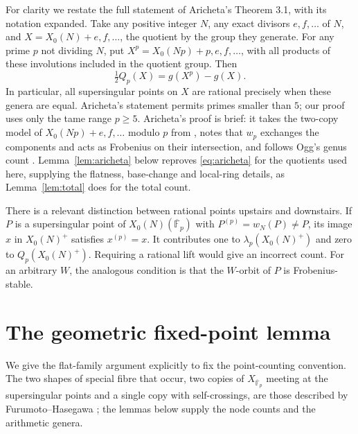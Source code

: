 \documentclass[11pt,a4paper]{article}
\theoremstyle{remark}\newtheorem{remark}[theorem]{Remark}
\numberwithin{equation}{section}
\newcommand{\kk}{\overline{\mathbb F}_p}
\begin{document}
	For clarity we restate the full statement of Aricheta's Theorem 3.1, with its notation expanded. Take any positive integer $N$, any exact divisors $e,f,\ldots$ of $N$, and $X=X_0(N)+e,f,\ldots$, the quotient by the group they generate. For any prime $p$ not dividing $N$, put $X^p=X_0(Np)+p,e,f,\ldots$, with all products of these involutions included in the quotient group. Then
	\begin{equation}\label{eq:aricheta}
		\tfrac12Q_p(X)=g(X^p)-g(X).
	\end{equation}
	In particular, all supersingular points on $X$ are rational precisely when these genera are equal. Aricheta's statement permits primes smaller than $5$; our proof uses only the tame range $p\geq5$. Aricheta's proof is brief: it takes the two-copy model of $X_0(Np)+e,f,\ldots$ modulo $p$ from \cite[Section 5]{FH}, notes that $w_p$ exchanges the components and acts as Frobenius on their intersection, and follows Ogg's genus count \cite{OggRed}. Lemma~\ref{lem:aricheta} below reproves \eqref{eq:aricheta} for the quotients used here, supplying the flatness, base-change and local-ring details, as Lemma~\ref{lem:total} does for the total count.
	
	There is a relevant distinction between rational points upstairs and downstairs. If $P$ is a supersingular point of $X_0(N)(\kk)$ with $P^{(p)}=w_N(P)\ne P$, its image $x$ in $X_0(N)^+$ satisfies $x^{(p)}=x$. It contributes one to $\lambda_p(X_0(N)^+)$ and zero to $Q_p(X_0(N)^+)$. Requiring a rational lift would give an incorrect count. For an arbitrary $W$, the analogous condition is that the $W$-orbit of $P$ is Frobenius-stable.
	
	\section{The geometric fixed-point lemma}\label{sec:geometry}
	We give the flat-family argument explicitly to fix the point-counting convention. The two shapes of special fibre that occur, two copies of $X_{\kk}$ meeting at the supersingular points and a single copy with self-crossings, are those described by Furumoto--Hasegawa \cite[Section 5, Figures 1 and 2]{FH}; the lemmas below supply the node counts and the arithmetic genera.
	
\end{document}
